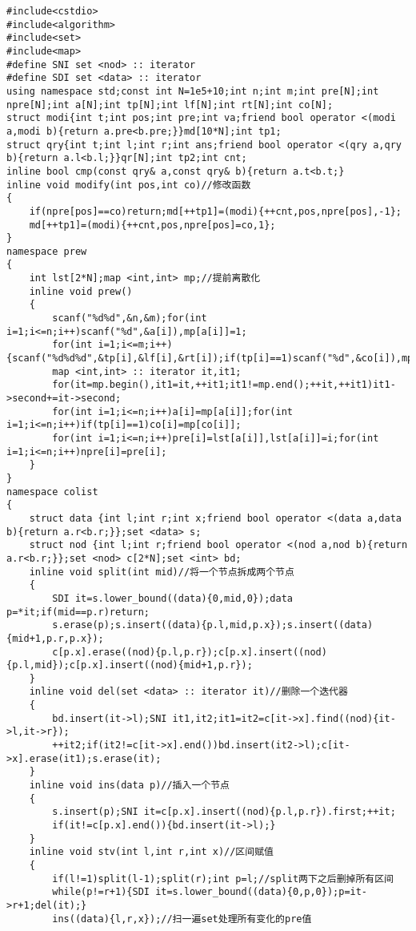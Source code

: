 \begin{verbatim}
#include<cstdio>
#include<algorithm>
#include<set>
#include<map> 
#define SNI set <nod> :: iterator 
#define SDI set <data> :: iterator 
using namespace std;const int N=1e5+10;int n;int m;int pre[N];int npre[N];int a[N];int tp[N];int lf[N];int rt[N];int co[N];
struct modi{int t;int pos;int pre;int va;friend bool operator <(modi a,modi b){return a.pre<b.pre;}}md[10*N];int tp1;
struct qry{int t;int l;int r;int ans;friend bool operator <(qry a,qry b){return a.l<b.l;}}qr[N];int tp2;int cnt;
inline bool cmp(const qry& a,const qry& b){return a.t<b.t;}
inline void modify(int pos,int co)//修改函数
{
    if(npre[pos]==co)return;md[++tp1]=(modi){++cnt,pos,npre[pos],-1};
    md[++tp1]=(modi){++cnt,pos,npre[pos]=co,1};
}
namespace prew
{
    int lst[2*N];map <int,int> mp;//提前离散化
    inline void prew()
    {
        scanf("%d%d",&n,&m);for(int i=1;i<=n;i++)scanf("%d",&a[i]),mp[a[i]]=1;
        for(int i=1;i<=m;i++){scanf("%d%d%d",&tp[i],&lf[i],&rt[i]);if(tp[i]==1)scanf("%d",&co[i]),mp[co[i]]=1;}
        map <int,int> :: iterator it,it1;
        for(it=mp.begin(),it1=it,++it1;it1!=mp.end();++it,++it1)it1->second+=it->second;
        for(int i=1;i<=n;i++)a[i]=mp[a[i]];for(int i=1;i<=n;i++)if(tp[i]==1)co[i]=mp[co[i]];
        for(int i=1;i<=n;i++)pre[i]=lst[a[i]],lst[a[i]]=i;for(int i=1;i<=n;i++)npre[i]=pre[i];
    }
}
namespace colist
{
    struct data {int l;int r;int x;friend bool operator <(data a,data b){return a.r<b.r;}};set <data> s;
    struct nod {int l;int r;friend bool operator <(nod a,nod b){return a.r<b.r;}};set <nod> c[2*N];set <int> bd;
    inline void split(int mid)//将一个节点拆成两个节点
    {
        SDI it=s.lower_bound((data){0,mid,0});data p=*it;if(mid==p.r)return;
        s.erase(p);s.insert((data){p.l,mid,p.x});s.insert((data){mid+1,p.r,p.x});
        c[p.x].erase((nod){p.l,p.r});c[p.x].insert((nod){p.l,mid});c[p.x].insert((nod){mid+1,p.r});
    }
    inline void del(set <data> :: iterator it)//删除一个迭代器
    {
        bd.insert(it->l);SNI it1,it2;it1=it2=c[it->x].find((nod){it->l,it->r});
        ++it2;if(it2!=c[it->x].end())bd.insert(it2->l);c[it->x].erase(it1);s.erase(it);
    }
    inline void ins(data p)//插入一个节点
    {
        s.insert(p);SNI it=c[p.x].insert((nod){p.l,p.r}).first;++it;
        if(it!=c[p.x].end()){bd.insert(it->l);}
    }
    inline void stv(int l,int r,int x)//区间赋值
    {
        if(l!=1)split(l-1);split(r);int p=l;//split两下之后删掉所有区间
        while(p!=r+1){SDI it=s.lower_bound((data){0,p,0});p=it->r+1;del(it);}
        ins((data){l,r,x});//扫一遍set处理所有变化的pre值

\end{verbatim}
